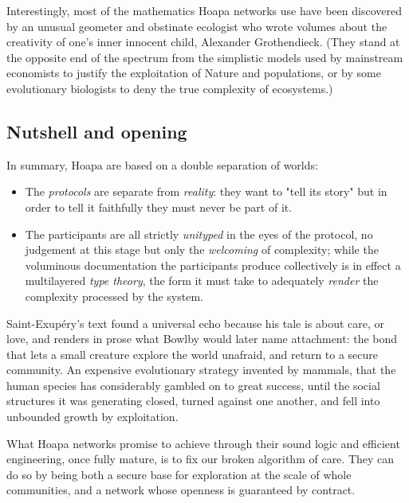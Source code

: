 \documentclass[11pt]{article}
\begin{document}
Interestingly, most of the mathematics Hoapa networks use have been discovered by an unusual geometer and obstinate ecologist who wrote volumes about the creativity of one's inner innocent child, Alexander Grothendieck. (They stand at the opposite end of the spectrum from the simplistic models used by mainstream economists to justify the exploitation of Nature and populations, or by some evolutionary biologists to deny the true complexity of ecosystems.)

\subsection{Nutshell and opening}

In summary, Hoapa are based on a double separation of worlds:

\begin{itemize}

\item The \emph{protocols} are separate from \emph{reality}: they want to "tell its story" but in order to tell it faithfully they must never be part of it.

\item The participants are all strictly \emph{unityped} in the eyes of the protocol, no judgement at this stage but only the \emph{welcoming} of complexity; while the voluminous documentation the participants produce collectively is in effect a multilayered \emph{type theory}, the form it must take to adequately \emph{render} the complexity processed by the system.

\end{itemize}

Saint-Exupéry's text found a universal echo because his tale is about care, or love, and renders in prose what Bowlby would later name attachment: the bond that lets a small creature explore the world unafraid, and return to a secure community. An expensive evolutionary strategy invented by mammals, that the human species has considerably gambled on to great success, until the social structures it was generating closed, turned against one another, and fell into unbounded growth by exploitation.

What Hoapa networks promise to achieve through their sound logic and efficient engineering, once fully mature, is to fix our broken algorithm of care. They can do so by being both a secure base for exploration at the scale of whole communities, and a network whose openness is guaranteed by contract.
\end{document}
